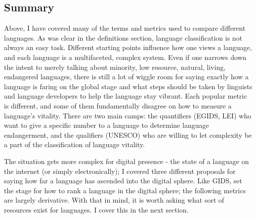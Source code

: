 \subsection{Summary}

Above, I have covered many of the terms and metrics used to compare different languages. As was clear in the definitions section, language classification is not always an easy task. Different starting points influence how one views a language, and each language is a multifaceted, complex system. Even if one narrows down the intent to merely talking about minority, low resource, natural, living, endangered languages, there is still a lot of wiggle room for saying exactly how a language is faring on the global stage and what steps should be taken by linguists and language developers to help the language stay vibrant. Each popular metric is different, and some of them fundamentally disagree on how to measure a language's vitality. There are two main camps: the quantifiers (EGIDS, LEI) who want to give a specific number to a language to determine language endangerment, and the qualifiers (UNESCO) who are willing to let complexity be a part of the classification of language vitality. 

The situation gets more complex for digital presence - the state of a language on the internet (or simply electronically); I covered three different proposals for saying how far a language has ascended into the digital sphere. Like GIDS, \citet{kornai2013digital} set the stage for how to rank a language in the digital sphere; the following metrics are largely derivative. With that in mind, it is worth asking what sort of resources exist for languages. I cover this in the next section.



